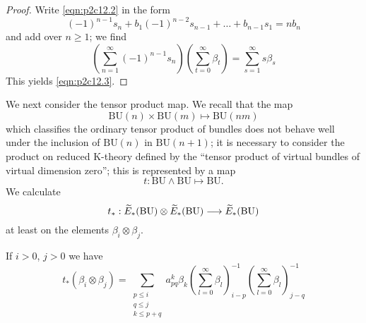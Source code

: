 \documentclass[../main]{subfiles}
\begin{document}
\begin{proof}
Write \eqref{eqn:p2c12.2} in the form $$(-1)^{n-1}s_n + b_1(-1)^{n-2}s_{n-1} + \dots + b_{n-1} s_1 = nb_n$$
and add over $n\ge 1$; we find $$\left(\sum^\infty_{n=1}(-1)^{n-1} s_n \right)\left(\sum^\infty_{t=0}\beta_t\right) = \sum^\infty_{s=1}s\beta_s$$
This yields \eqref{eqn:p2c12.3}.
\end{proof}
We next consider the tensor product map. We recall that the map $$ \mathrm{BU}(n)\times \mathrm{BU}(m)\mapsto \mathrm{BU}(nm)$$
which classifies the ordinary tensor product of bundles does not behave well under the inclusion of $ \mathrm{BU}(n)$ in $\mathrm{BU}(n+1)$; it is necessary to consider the product on reduced K-theory defined by the ``tensor product of virtual bundles of virtual dimension zero''; this is represented by a map $$t: \mathrm{BU}\wedge \mathrm{BU}\mapsto \mathrm{BU}.$$
We calculate $$t_\ast : \widetilde{E}_\ast(\mathrm{BU})\otimes\widetilde{E}_\ast(\mathrm{BU})\longrightarrow\widetilde{E}_\ast(\mathrm{BU})$$ at least on the elements $\beta_i\otimes\beta_j$.
\begin{proposition}
\label{prop:p2c12.4}
If $i>0$, $j>0$ we have \begin{equation*}
t_\ast(\beta_i\otimes\beta_j)=\sum_{\substack{p\le i\\ q\le j\\ k\le p+q}} a^k_{pq}\beta_k \left(\sum^\infty_{l=0}\beta_l\right)^{-1}_{i-p}\left(\sum^\infty_{l=0}\beta_l\right)^{-1}_{j-q}
\end{equation*}
\end{proposition}
\end{document}

